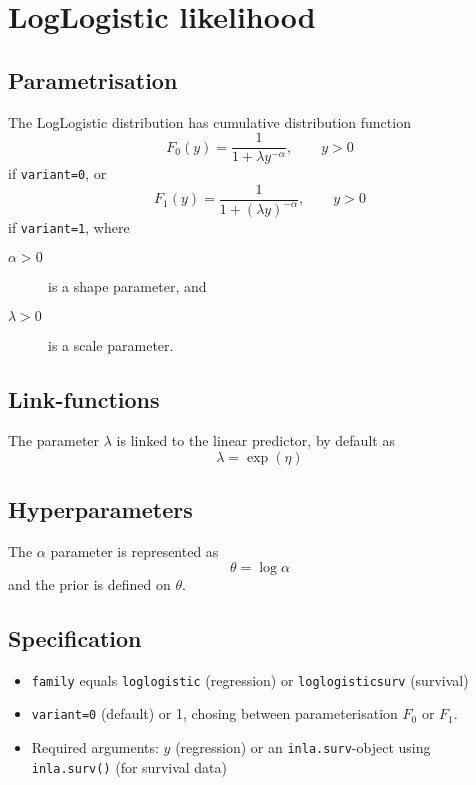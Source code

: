 \documentclass[a4paper,11pt]{article}
\begin{document}
\section*{LogLogistic likelihood}

\subsection*{Parametrisation}

The LogLogistic distribution has cumulative distribution function
\begin{displaymath}
    F_0(y) = \frac{1}{1 + \lambda y^{-\alpha}}, \qquad y > 0
\end{displaymath}
if \texttt{variant=0}, or
\begin{displaymath}
    F_1(y) = \frac{1}{1 + (\lambda y)^{-\alpha}}, \qquad y > 0
\end{displaymath}
if \texttt{variant=1}, where
\begin{description}
\item[$\alpha > 0$] is a shape parameter, and
\item[$\lambda > 0$] is a scale parameter.
\end{description}

\subsection*{Link-functions}

The parameter $\lambda$ is linked to the linear predictor, by default
as
\[
    \lambda = \exp(\eta)
\]

\subsection*{Hyperparameters}

The $\alpha$ parameter is represented as
\[
    \theta = \log\alpha
\]
and the prior is defined on $\theta$.

\subsection*{Specification}

\begin{itemize}
\item \texttt{family} equals \texttt{loglogistic} (regression) or
    \texttt{loglogisticsurv} (survival)
\item \texttt{variant=0} (default) or 1, chosing between
    parameterisation $F_0$ or $F_1$.
\item Required arguments: $y$ (regression) or an
    \texttt{inla.surv}-object using \texttt{inla.surv()} (for survival
    data)
\end{itemize}
\end{document}
